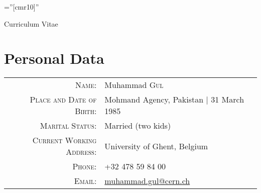 \documentclass[a4paper,10pt]{article}
\begin{document}

\pagestyle{empty} %

\font\fb=''[cmr10]'' %

\par{\centering
		{\Huge Curriculum Vitae
	}\bigskip\par}

\section{Personal Data}

\begin{tabular}{rl}
    \textsc{Name:} & Muhammad \textsc{Gul} \\
    \textsc{Place and Date of Birth:} & Mohmand Agency, Pakistan  | 31 March 1985 \\
    \textsc{Marital Status:} & Married (two kids)\\
    \textsc{Current Working Address:}   & University of Ghent, Belgium \\
    \textsc{Phone:}     & +32 478 59 84 00\\
    \textsc{Email:}     & \href{mailto:muhammad.gul@cern.ch}{muhammad.gul@cern.ch}
\end{tabular}

\end{document}
